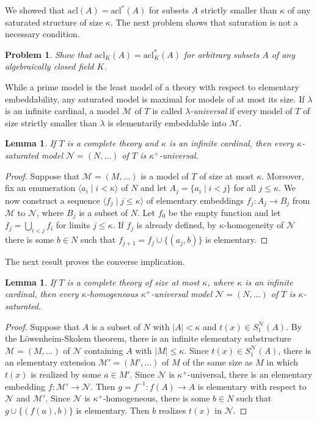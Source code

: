 \documentclass[10pt]{amsart}
\newcommand{\MM}{\mathcal{M}}
\newcommand{\NN}{\mathcal{N}}
\newcommand{\acl}{\mathrm{acl}}
\newtheorem{lemma}[theorem]{Lemma}
\newtheorem{problem}[theorem]{Problem}
\theoremstyle{definition}
\theoremstyle{remark}
\begin{document}
We showed that $\acl(A)=\acl^*(A)$ for subsets $A$ strictly smaller than $\kappa$ of any saturated structure of size $\kappa$. The next problem shows that saturation is not a necessary condition. 

\begin{problem} 
Show that $\acl_K(A)=\acl_K^*(A)$ for arbitrary subsets $A$ of any algebraically closed field $K$. 
\end{problem} 

While a prime model is the least model of a theory with respect to elementary embeddability, any saturated model is maximal for models of at most its size. If $\lambda$ is an infinite cardinal, a model $\MM$ of $T$ is called \emph{$\lambda$-universal} if every model of $T$ of size strictly smaller than $\lambda$ is elementarily embeddable into $\MM$.  

\begin{lemma} 
If $T$ is a complete theory and $\kappa$ is an infinite cardinal, then every $\kappa$-saturated model $\NN=(N,\dots)$ of $T$ is $\kappa^+$-universal. 
\end{lemma} 
\begin{proof} 
Suppose that $\MM=(M,\dots)$ is a model of $T$ of size at most $\kappa$. Moreover, fix an enumeration $\langle a_i\mid i<\kappa\rangle$ of $N$ and let $A_j=\{a_i\mid i<j\}$ for all $j\leq \kappa$. We  now construct a sequence $\langle f_j\mid j\leq \kappa\rangle$ of elementary embeddings $f_j\colon A_j\rightarrow B_j$ from $\MM$ to $\NN$, where $B_j$ is a subset of $N$. Let $f_0$ be the empty function and let $f_j=\bigcup_{i<j}f_i$ for limits $j\leq\kappa$. If $f_j$ is already defined, by $\kappa$-homogeneity of $\NN$ there is some $b\in N$ such that $f_{j+1}=f_j\cup\{(a_j,b)\}$ is elementary. 
\end{proof} 

The next result proves the converse implication. 

\begin{lemma} 
If $T$ is a complete theory of size at most $\kappa$, where $\kappa$ is an infinite cardinal, then every $\kappa$-homogeneous $\kappa^+$-universal model $\NN=(N,\dots)$ of $T$ is $\kappa$-saturated. 
\end{lemma} 
\begin{proof} 
Suppose that $A$ is a subset of $N$ with $|A|<\kappa$ and $t(x)\in S_1^\NN(A)$. By the L\"owenheim-Skolem theorem, there is an infinite elementary substructure $\MM=(M,\dots)$ of $\NN$ containing $A$ with $|M|\leq\kappa$. Since $t(x)\in S_1^\NN(A)$, there is an elementary extension $\MM'=(M',\dots)$ of $M$ of the same size as $M$ in which $t(x)$ is realized by some $a\in M'$. Since $\NN$ is $\kappa^+$-universal, there is an elementary embedding $f\colon \MM'\rightarrow \NN$. Then $g=f^{-1}\colon f(A)\rightarrow A$ is elementary with respect to $\NN$ and $\MM'$. Since $\NN$ is $\kappa^+$-homogeneous, there is some $b\in N$ such that $g\cup\{(f(a),b)\}$ is elementary. Then $b$ realizes $t(x)$ in $\NN$. 
\end{proof} 
\end{document}
